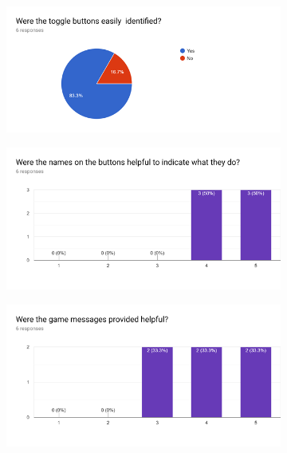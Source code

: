 \documentclass{l4proj}
\begin{document}
\begin{appendices}
\begin{figure}[H]
\centering
\begin{subfigure}[b]{\textwidth}
\centering
\includegraphics[width=\textwidth]{A1/5.png}
\end{subfigure}
\end{figure}


\begin{figure}[H]
\centering
\begin{subfigure}[b]{\textwidth}
\centering
\includegraphics[width=\textwidth]{A1/6.png}
\end{subfigure}
\end{figure}



\begin{figure}[H]
\centering
\begin{subfigure}[b]{\textwidth}
\centering
\includegraphics[width=\textwidth]{A1/7.png}
\end{subfigure}
\end{figure}



\end{appendices}
\end{document}
